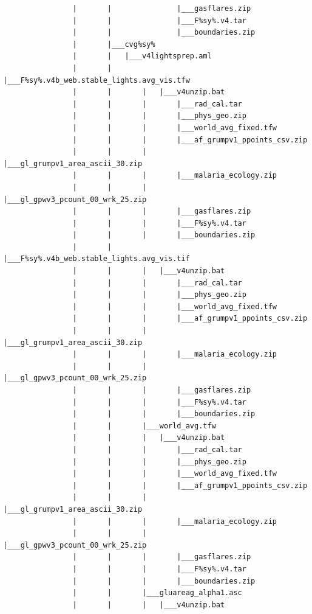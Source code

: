 \documentclass[]{book}
\begin{document}
\begin{verbatim}
                |       |               |___gasflares.zip
                |       |               |___F%sy%.v4.tar
                |       |               |___boundaries.zip
                |       |___cvg%sy%
                |       |   |___v4lightsprep.aml
                |       |       |___F%sy%.v4b_web.stable_lights.avg_vis.tfw
                |       |       |   |___v4unzip.bat
                |       |       |       |___rad_cal.tar
                |       |       |       |___phys_geo.zip
                |       |       |       |___world_avg_fixed.tfw
                |       |       |       |___af_grumpv1_ppoints_csv.zip
                |       |       |       |___gl_grumpv1_area_ascii_30.zip
                |       |       |       |___malaria_ecology.zip
                |       |       |       |___gl_gpwv3_pcount_00_wrk_25.zip
                |       |       |       |___gasflares.zip
                |       |       |       |___F%sy%.v4.tar
                |       |       |       |___boundaries.zip
                |       |       |___F%sy%.v4b_web.stable_lights.avg_vis.tif
                |       |       |   |___v4unzip.bat
                |       |       |       |___rad_cal.tar
                |       |       |       |___phys_geo.zip
                |       |       |       |___world_avg_fixed.tfw
                |       |       |       |___af_grumpv1_ppoints_csv.zip
                |       |       |       |___gl_grumpv1_area_ascii_30.zip
                |       |       |       |___malaria_ecology.zip
                |       |       |       |___gl_gpwv3_pcount_00_wrk_25.zip
                |       |       |       |___gasflares.zip
                |       |       |       |___F%sy%.v4.tar
                |       |       |       |___boundaries.zip
                |       |       |___world_avg.tfw
                |       |       |   |___v4unzip.bat
                |       |       |       |___rad_cal.tar
                |       |       |       |___phys_geo.zip
                |       |       |       |___world_avg_fixed.tfw
                |       |       |       |___af_grumpv1_ppoints_csv.zip
                |       |       |       |___gl_grumpv1_area_ascii_30.zip
                |       |       |       |___malaria_ecology.zip
                |       |       |       |___gl_gpwv3_pcount_00_wrk_25.zip
                |       |       |       |___gasflares.zip
                |       |       |       |___F%sy%.v4.tar
                |       |       |       |___boundaries.zip
                |       |       |___gluareag_alpha1.asc
                |       |       |   |___v4unzip.bat

\end{verbatim}
\end{document}
